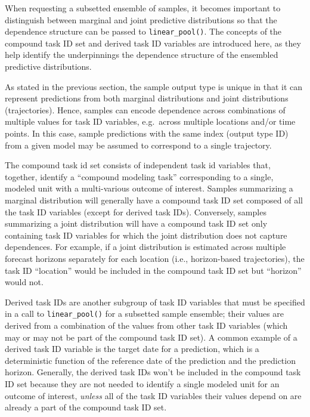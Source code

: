 \documentclass[
]{article}
\begin{document}
When requesting a subsetted ensemble of samples, it becomes important to
distinguish between marginal and joint predictive distributions so that
the dependence structure can be passed to \texttt{linear\_pool()}. The
concepts of the compound task ID set and derived task ID variables are
introduced here, as they help identify the underpinnings the dependence
structure of the ensembled predictive distributions.

As stated in the previous section, the sample output type is unique in
that it can represent predictions from both marginal distributions and
joint distributions (trajectories). Hence, samples can encode dependence
across combinations of multiple values for task ID variables,
e.g.~across multiple locations and/or time points. In this case, sample
predictions with the same index (output type ID) from a given model may
be assumed to correspond to a single trajectory.

The compound task id set consists of independent task id variables that,
together, identify a ``compound modeling task'' corresponding to a
single, modeled unit with a multi-various outcome of interest. Samples
summarizing a marginal distribution will generally have a compound task
ID set composed of all the task ID variables (except for derived task
IDs). Conversely, samples summarizing a joint distribution will have a
compound task ID set only containing task ID variables for which the
joint distribution does not capture dependences. For example, if a joint
distribution is estimated across multiple forecast horizons separately
for each location (i.e., horizon-based trajectories), the task ID
``location'' would be included in the compound task ID set but
``horizon'' would not.

Derived task IDs are another subgroup of task ID variables that must be
specified in a call to \texttt{linear\_pool()} for a subsetted sample
ensemble; their values are derived from a combination of the values from
other task ID variables (which may or may not be part of the compound
task ID set). A common example of a derived task ID variable is the
target date for a prediction, which is a deterministic function of the
reference date of the prediction and the prediction horizon. Generally,
the derived task IDs won't be included in the compound task ID set
because they are not needed to identify a single modeled unit for an
outcome of interest, \emph{unless} all of the task ID variables their
values depend on are already a part of the compound task ID set.
\end{document}
